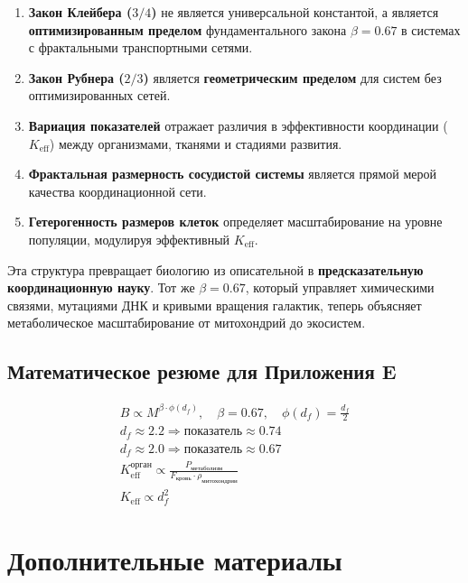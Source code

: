 \documentclass[12pt]{article}
\newcommand{\Keff}{K_{\mathrm{eff}}}
\begin{document}
	\begin{enumerate}
		\item \textbf{Закон Клейбера (\(3/4\))} не является универсальной константой, а является \textbf{оптимизированным пределом} фундаментального закона \(\beta = 0.67\) в системах с фрактальными транспортными сетями.
		\item \textbf{Закон Рубнера (\(2/3\))} является \textbf{геометрическим пределом} для систем без оптимизированных сетей.
		\item \textbf{Вариация показателей} отражает различия в эффективности координации (\(\Keff\)) между организмами, тканями и стадиями развития.
		\item \textbf{Фрактальная размерность сосудистой системы} является прямой мерой качества координационной сети.
		\item \textbf{Гетерогенность размеров клеток} определяет масштабирование на уровне популяции, модулируя эффективный \(\Keff\).
	\end{enumerate}
	
	Эта структура превращает биологию из описательной в \textbf{предсказательную координационную науку}. Тот же \(\beta = 0.67\), который управляет химическими связями, мутациями ДНК и кривыми вращения галактик, теперь объясняет метаболическое масштабирование от митохондрий до экосистем.
	
	\subsection{Математическое резюме для Приложения E}
	
	\begin{align}
		\boxed{B \propto M^{\beta \cdot \phi(d_f)},\quad \beta = 0.67,\quad \phi(d_f) = \frac{d_f}{2}} \\
		\boxed{d_f \approx 2.2 \Rightarrow \text{показатель} \approx 0.74} \\
		\boxed{d_f \approx 2.0 \Rightarrow \text{показатель} \approx 0.67} \\
		\boxed{\Keff^{\text{орган}} \propto \frac{P_{\text{метаболизм}}}{F_{\text{кровь}} \cdot \rho_{\text{митохондрии}}}} \\
		\boxed{\Keff \propto d_f^{2}}
	\end{align}
	
	\appendix
	\section{Дополнительные материалы}
	
\end{document}
